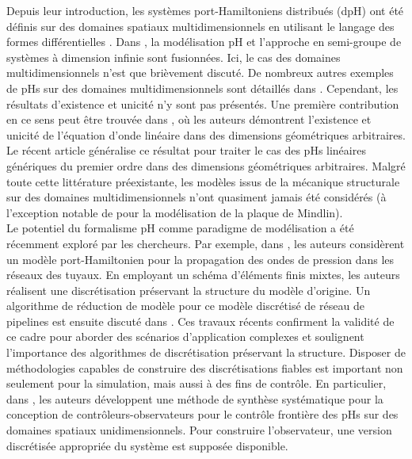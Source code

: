 Depuis leur introduction, les systèmes port-Hamiltoniens distribués (dpH) ont été définis sur des domaines spatiaux multidimensionnels en utilisant le langage des formes différentielles \cite{vanderschaft2002}. Dans \cite{villegas2007}, la modélisation pH et l'approche en semi-groupe de systèmes à dimension infinie sont fusionnées. Ici, le cas des domaines multidimensionnels n'est que brièvement discuté. De nombreux autres exemples de pHs sur des domaines multidimensionnels sont détaillés dans \cite[Chapitre 4]{duindam2009}. Cependant, les résultats d'existence et unicité n'y sont pas présentés. Une première contribution en ce sens peut être trouvée dans \cite{zwart2015wave}, où les auteurs démontrent l'existence et unicité de l'équation d'onde linéaire dans des dimensions géométriques arbitraires. Le récent article \cite{skrepek2019wellposedness} généralise ce résultat pour traiter le cas des pHs linéaires génériques du premier ordre dans des dimensions géométriques arbitraires. Malgré toute cette littérature préexistante, les modèles issus de la mécanique structurale sur des domaines multidimensionnels n'ont quasiment jamais été considérés (à l'exception notable de \cite{macchelli2005mindlin} pour la modélisation de la plaque de Mindlin). \\

Le potentiel du formalisme pH comme paradigme de modélisation a été récemment exploré par les chercheurs. Par exemple, dans \cite{egger2018damped}, les auteurs considèrent un modèle port-Hamiltonien pour la propagation des ondes de pression dans les réseaux des tuyaux. En employant un schéma d'éléments finis mixtes, les auteurs réalisent une discrétisation préservant la structure du modèle d'origine. Un algorithme de réduction de modèle pour ce modèle discrétisé de réseau de pipelines est ensuite discuté dans \cite{egger2018}. Ces travaux récents confirment la validité de ce cadre pour aborder des scénarios d'application complexes et soulignent l'importance des algorithmes de discrétisation préservant la structure. Disposer de méthodologies capables de construire des discrétisations fiables est important non seulement pour la simulation, mais aussi à des fins de contrôle. En particulier, dans \cite{toledo2020}, les auteurs développent une méthode de synthèse systématique pour la conception de contrôleurs-observateurs pour le contrôle frontière des pHs sur des domaines spatiaux unidimensionnels. Pour construire l'observateur, une version discrétisée appropriée du système est supposée disponible. \\

